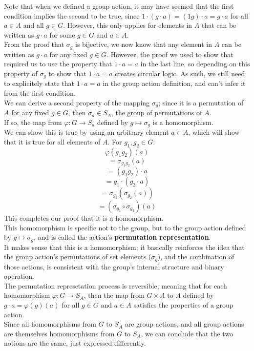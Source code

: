 \documentclass[12pt]{article}
\begin{document}
    Note that when we defined a group action,
    it may have seemed that the first condition
    implies the second to be true,
    since $1 \cdot (g \cdot a) = (1g) \cdot a = g \cdot a$
    for all $a \in A$ and all $g \in G$.
    However, this only applies for elements in $A$
    that can be written as $g \cdot a$
    for some $g \in G$ and $a \in A$. \\
    From the proof that $\sigma_g$ is bijective,
    we now know that any element in $A$ can be written as $g \cdot a$
    for any fixed $g \in G$.
    However, the proof we used to show that required
    us to use the property that $1 \cdot a = a$
    in the last line,
    so depending on this property of $\sigma_g$
    to show that $1 \cdot a = a$ creates circular logic.
    As such, we still need to explicitely state that
    $1 \cdot a = a$ in the group action definition,
    and can't infer it from the first condition. \\

    We can derive a second property of the mapping $\sigma_g$;
    since it is a permutation of $A$
    for any fixed $g \in G$,
    then $\sigma_a \in S_A$, the group of permutations of $A$. \\
    If so, the map from $\varphi: G \to S_a$
    defined by $g \mapsto \sigma_g$
    is a homomorphism. \\
    We can show this is true by using an arbitrary element
    $a \in A$,
    which will show that it is true for all elements of $A$.
    For $g_1, g_2 \in G$:
    \[ \varphi(g_1g_2)(a) \]
    \[ = \sigma_{g_1g_2}(a) \]
    \[ = (g_1g_2) \cdot a \]
    \[ = g_1 \cdot (g_2 \cdot a) \]
    \[ = \sigma_{g_1}(\sigma_{g_2}(a)) \]
    \[ = (\sigma_{g_1} \circ \sigma_{g_2})(a) \]
    This completes our proof that it is a homomorphism. \\
    This homomorphism is specific not to the group,
    but to the group action defined by $g \mapsto \sigma_g$,
    and is called the action's \textbf{permutation representation}. \\
    It makes sense that this is a homomorphism;
    it basically reinforces the idea that the group action's
    permutations of set elements ($\sigma_g$),
    and the combination of those actions,
    is consistent with the group's internal structure
    and binary operation. \\

    The permutation represetation process is reversible;
    meaning that for each homomorphism $\varphi: G \to S_A$,
    then the map from $G \times A$ to $A$ defined by
    $g \cdot a = \varphi(g)(a)$ for all $g \in G$ and $a \in A$
    satisfies the properties of a group action. \\
    Since all homomorphisms from $G$ to $S_A$ are group actions,
    and all group actions are themselves homomorphisms from $G$ to $S_A$,
    we can conclude that the two notions are the same,
    just expressed differently. \\
\end{document}
